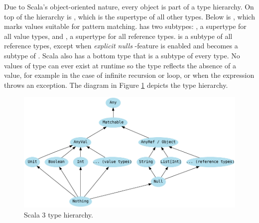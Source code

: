 

Due to Scala's object-oriented nature, every object is part of a type hierarchy. On top of the hierarchy is , which is the supertype of all other types. Below  is , which marks values suitable for pattern matching.  has two subtypes: , a supertype for all value types, and , a supertype for all reference types.  is a subtype of all reference types, except when \emph{explicit nulls} -feature is enabled and  becomes a subtype of . Scala also has a bottom type  that is a subtype of every type. No values of type  can ever exist at runtime so the type reflects the absence of a value, for example in the case of infinite recursion or loop, or when the expression throws an exception. The diagram in Figure \ref{fig:scala-type-hierarchy} depicts the type hierarchy.

\begin{figure}
    \centering
    \includegraphics{images/type-hierarchy}
    \caption{Scala 3 type hierarchy.}
    \label{fig:scala-type-hierarchy}
\end{figure}

